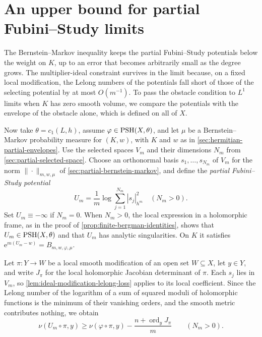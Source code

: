 \section{An upper bound for partial Fubini--Study limits}
\label{sec:partial-kernel-upper}

The Bernstein--Markov inequality keeps the partial Fubini--Study potentials below the weight on $K$, up to an error that becomes arbitrarily small as the degree grows. The multiplier-ideal constraint survives in the limit because, on a fixed local modification, the Lelong numbers of the potentials fall short of those of the selecting potential by at most $O(m^{-1})$. To pass the obstacle condition to $L^1$ limits when $K$ has zero smooth volume, we compare the potentials with the envelope of the obstacle alone, which is defined on all of $X$.

Now take $\theta=c_1(L,h)$, assume $\varphi\in\mathrm{PSH}(X,\theta)$, and let $\mu$ be a Bernstein--Markov probability measure for $(K,w)$, with $K$ and $w$ as in \cref{sec:hermitian-partial-envelopes}. Use the selected spaces $V_m$ and their dimensions $N_m$ from \cref{sec:partial-selected-space}. Choose an orthonormal basis $s_1,\ldots,s_{N_m}$ of $V_m$ for the norm $\|\cdot\|_{m,w,\mu}$ of \cref{sec:partial-bernstein-markov}, and define the \emph{partial Fubini--Study potential}
\[
 U_m=\frac1m\log\sum_{j=1}^{N_m}|s_j|_{h^m}^2
 \quad(N_m>0).
\]
Set $U_m\equiv-\infty$ if $N_m=0$. When $N_m>0$, the local expression in a holomorphic frame, as in the proof of \cref{prop:finite-bergman-identities}, shows that $U_m\in\mathrm{PSH}(X,\theta)$ and that $U_m$ has analytic singularities. On $K$ it satisfies $\mathrm{e}^{m(U_m-w)}=B_{m,w,\varphi,\mu}$.

Let $\pi\colon Y\to W$ be a local smooth modification of an open set $W\subseteq X$, let $y\in Y$, and write $J_\pi$ for the local holomorphic Jacobian determinant of $\pi$. Each $s_j$ lies in $V_m$, so \cref{lem:ideal-modification-lelong-loss} applies to its local coefficient. Since the Lelong number of the logarithm of a sum of squared moduli of holomorphic functions is the minimum of their vanishing orders, and the smooth metric contributes nothing, we obtain
\[
 \nu(U_m\circ\pi,y)
       \geq\nu(\varphi\circ\pi,y)
                   -\frac{n+\operatorname{ord}_yJ_\pi}{m}
 \qquad(N_m>0).
\]

